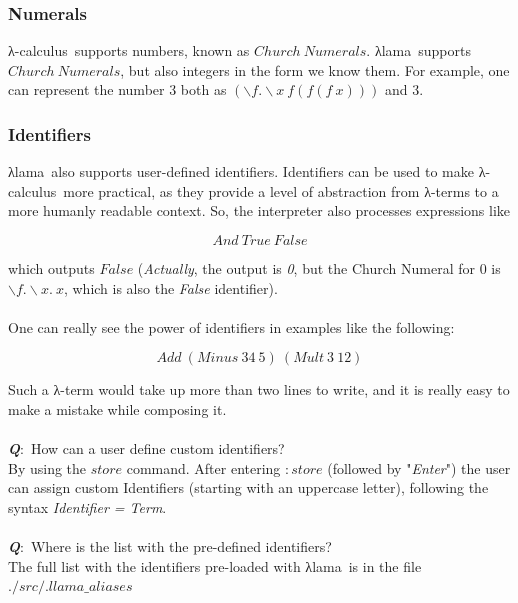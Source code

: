 \documentclass[a4paper]{article}
\newcommand{\lc}{\textgreek{λ}-calculus\ }
\newcommand{\la}{\textgreek{λ}}
\newcommand{\intr}{\textgreek{λ}lama\ }
\begin{document}
\subsubsection{Numerals}

\lc supports numbers, known as $Church\ Numerals$. \intr supports $Church\ Numerals$, but also integers in the form we know them. For example, one can represent the number 3 both as $(\backslash f.\backslash x \ f(f(f\ x)))$ and 3.

\subsubsection{Identifiers}
\intr also supports user-defined identifiers. Identifiers can be used to make \lc more practical, as they provide a level of abstraction from \la-terms to a more humanly readable context. So, the interpreter also processes expressions like

\begin{displaymath}
And\ True\ False
\end{displaymath}

which outputs $False$ (\textit{Actually}, the output is \textit{0}, but the Church Numeral for 0 is $\backslash f.\backslash x.\ x$, which is also the \textit{False} identifier). 
~\\ \\
One can really see the power of identifiers in examples like the following:

\begin{displaymath}
Add\ (Minus\ 34\ 5)\ (Mult\ 3\ 12) 
\end{displaymath}

Such a \la-term would take up more than two lines to write, and it is really easy to make a mistake while composing it.
\\ \\ 
\noindent \textbf{\textit{Q}}:\ How can a user define custom identifiers? \\ 
By using the $store$ command. After entering $:store$ (followed by "\textit{Enter}") the user can assign custom Identifiers (starting with an uppercase letter), following the syntax \textit{Identifier = Term}.
\\ \\
\noindent \textbf{\textit{Q}}:\ Where is the list with the pre-defined identifiers? \\ 
The full list with the identifiers pre-loaded with \intr is in the file \\ $./src/.llama\_aliases$
\end{document}
